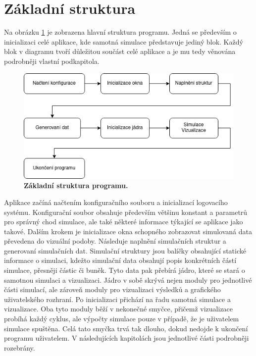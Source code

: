 \section{Základní struktura}
\label{chapter:zakladni_struktura}
Na obrázku \ref{fig:simpleStruct} je zobrazena hlavní struktura programu. Jedná se především o inicializaci celé aplikace, kde samotná simulace představuje jediný blok. Každý blok v diagramu tvoří důležitou součást celé aplikace a je mu tedy věnována podrobněji vlastní podkapitola.

\begin{figure}[hbt]
	\centering
	\captionsetup{justification=centering}
	\includegraphics[scale=0.6]{obrazky-figures/Simple.png}
	\caption{\textbf{Základní struktura programu.}}
	\label{fig:simpleStruct}
\end{figure}

Aplikace začíná načtením konfiguračního souboru a inicializací logovacího systému. Konfigurační soubor obsahuje především většinu konstant a parametrů pro správný chod simulace, ale také některé informace týkající se aplikace jako takové. Dalším krokem je inicializace okna schopného zobrazovat simulovaná data převedena do vizuální podoby. Následuje naplnění simulačních struktur a generovaní simulačních dat. Simulační struktury jsou balíčky obsahující statické informace o simulaci, kdežto simulační data obsahují popis konkrétních částí simulace, přesněji částic či buněk. Tyto data pak přebírá jádro, které se stará o samotnou simulaci a vizualizaci. Jádro v sobě skrývá nejen moduly pro jednotlivé části simulací, ale zároveň moduly pro vizualizaci výsledků a grafického uživatelského rozhraní. Po inicializaci přichází na řadu samotná simulace a vizualizace. Oba tyto moduly běží v nekonečné smyčce, přičemž vizualizace probíhá každý cyklus, ale výpočty simulace pouze v případě, že je uživatelem simulace spuštěna. Celá tato smyčka trvá tak dlouho, dokud nedojde k ukončení programu uživatelem. V následujících kapitolách jsou jednotlivé části podrobněji rozebrány. 

